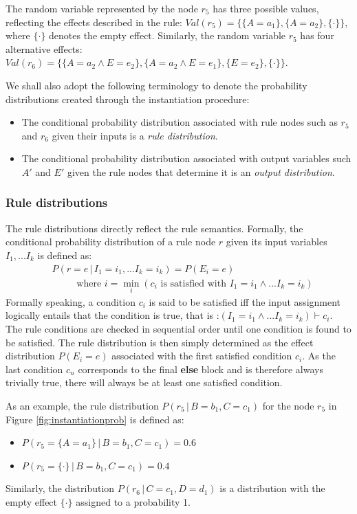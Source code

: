 The random variable represented by the node $r_5$ has three possible values, reflecting the effects described in the rule: $Val(r_5) = \{ \{A\!=\!a_1\}, \{A\!=\!a_2\}, \{\cdot\}\}$, where $\{\cdot\}$ denotes the empty effect.  Similarly, the random variable $r_5$ has four alternative effects: $Val(r_6) = \{\{A\!=\!a_2 \land E\!=\!e_2\}, \{A\!=\!a_2 \land E\!=\!e_1\}, \{E=e_2\}, \{\cdot\}\}$. 

We shall also adopt the following terminology to denote the probability distributions created through the instantiation procedure: 
\begin{itemize}
\item The conditional probability distribution associated with rule nodes such as $r_5$ and $r_6$ given their inputs is a \textit{rule distribution}.
\item The conditional probability distribution associated with output variables such $A'$ and $E'$ given the rule nodes that determine it is an \textit{output distribution}.
\end{itemize}

\subsubsection*{Rule distributions}

The rule distributions directly reflect the rule semantics.  Formally, the conditional probability distribution of a rule node $r$ given its input variables $I_1,...I_k$ is defined as: 
\begin{align}
& P(r\!=\!e \, | \, I_1\!=\!i_1,... I_k\!=\!i_k) = P(E_i = e) \label{eq:ruledistrib}
 \\ 
& \; \; \; \; \; \; \; \; \text{ where } i = \min_i (c_i \text{ is satisfied with } I_1\!=\!i_1 \land ... I_k\!=\!i_k) \nonumber 
\end{align}
Formally speaking, a condition $c_i$ is said to be satisfied iff the input assignment logically entails that the condition is true, that is :$(I_1\!=\!i_1 \land ... I_k\!=\!i_k) \vdash c_i$. The rule conditions are checked in sequential order until one condition is found to be satisfied. The rule distribution is then simply determined as the effect distribution $P(E_i\!=\!e)$ associated with the first satisfied condition $c_i$.  As the last condition $c_n$ corresponds to the final \textbf{else} block and is therefore always trivially true, there will always be at least one satisfied condition. 

As an example, the rule distribution $P(r_5 \, | \, B\!=\!b_1, C\!=\!c_1)$ for the node $r_5$ in Figure \ref{fig:instantiationprob} is defined as:
\begin{itemize}
\item $P(r_5 = \{A\!=\!a_1\} \, | \, B\!=\!b_1, C\!=\!c_1) = 0.6$
\item  $P(r_5 = \{\cdot\} \, | \, B\!=\!b_1, C\!=\!c_1) = 0.4$
\end{itemize}
Similarly, the distribution $P(r_6 \, | \, C\!=\!c_1, D\!=\!d_1)$ is a distribution with the empty effect $\{\cdot\}$ assigned to a probability 1. 

